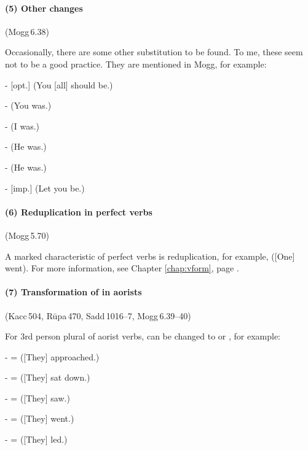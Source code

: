 \paragraph*{(5) Other changes} (Mogg\,6.38)\par
Occasionally, there are some other substitution to be found. To me, these seem not to be a good practice. They are mentioned in Mogg, for example:\par
-  [opt.] (You [all] should be.)\par
-  (You was.)\par
-  (I was.)\par
-  (He was.)\par
-  (He was.)\par
-  [imp.] (Let you be.)\par

\paragraph*{(6) Reduplication in perfect verbs} (Mogg\,5.70)\par
A marked characteristic of perfect verbs is reduplication, for example,  ([One] went). For more information, see Chapter \ref{chap:vform}, page \pageref{sec:redup}.

\paragraph*{(7) Transformation of  in aorists} (Kacc\,504, R\=upa\,470, Sadd\,1016--7, Mogg\,6.39--40)\par
For 3rd person plural of aorist verbs,  can be changed to  or , for example:\par
-  =  ([They] approached.)\par
-  =  ([They] sat down.)\par
-  =  ([They] saw.)\par
-  =  ([They] went.)\par
-  =  ([They] led.)\par

